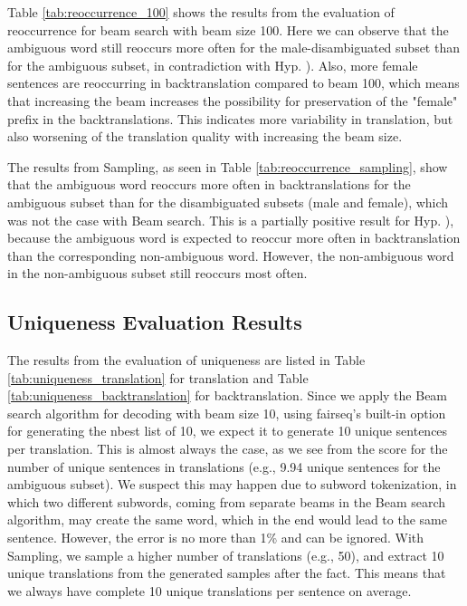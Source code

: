 Table \ref{tab:reoccurrence_100} shows the results from the evaluation of reoccurrence for beam search with beam size 100. Here we can observe that the ambiguous word still reoccurs more often for the male-disambiguated subset than for the ambiguous subset, in contradiction with Hyp. ).
Also, more female sentences are reoccurring in backtranslation compared to beam 100, which means that increasing the beam increases the possibility for preservation of the "female" prefix in the backtranslations. This indicates more variability in translation, but also worsening of the translation quality with increasing the beam size.

The results from Sampling, as seen in Table \ref{tab:reoccurrence_sampling}, show that the ambiguous word reoccurs more often in backtranslations for the ambiguous subset than for the disambiguated subsets (male and female), which was not the case with Beam search. This is a partially positive result for Hyp. ), because the ambiguous word is expected to reoccur more often in backtranslation than the corresponding non-ambiguous word. However, the non-ambiguous word in the non-ambiguous subset still reoccurs most often.

\subsection{Uniqueness Evaluation Results}
\label{ch:Base_Experiment:Results:Uniqueness}

The results from the evaluation of uniqueness are listed in Table \ref{tab:uniqueness_translation} for translation and Table \ref{tab:uniqueness_backtranslation} for backtranslation.
Since we apply the Beam search algorithm for decoding with beam size 10, using fairseq's built-in option for generating the nbest list of 10, we expect it to generate 10 unique sentences per translation. This is almost always the case, as we see from the score for the number of unique sentences in translations (e.g., 9.94 unique sentences for the ambiguous subset). We suspect this may happen due to subword tokenization, in which two different subwords, coming from separate beams in the Beam search algorithm, may create the same word, which in the end would lead to the same sentence. However, the error is no more than 1\% and can be ignored.
With Sampling, we sample a higher number of translations (e.g., 50), and extract 10 unique translations from the generated samples after the fact. This means that we always have complete 10 unique translations per sentence on average.


